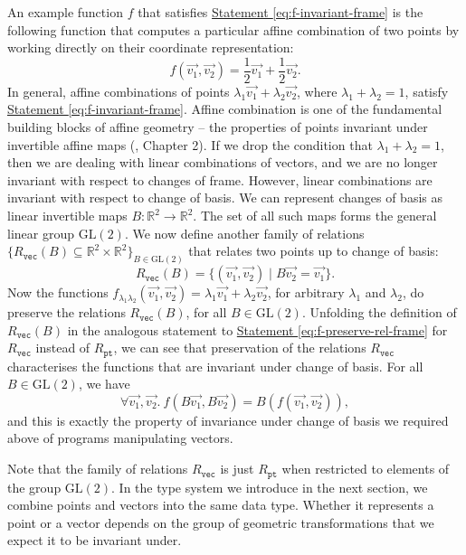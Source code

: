\documentclass{article}
\newcommand{\sepbar}{\mathrel|}
\newcommand{\GL}{\mathrm{GL}}
\newcommand{\statementref}[1]{\hyperref[#1]{Statement \ref*{#1}}}
\begin{document}
An example function $f$ that satisfies
\statementref{eq:f-invariant-frame} is the following function that
computes a particular affine combination of two points by working
directly on their coordinate representation:
\begin{displaymath}
  f(\vec{v_1}, \vec{v_2}) = \frac{1}{2}\vec{v_1} + \frac{1}{2}\vec{v_2}.
\end{displaymath}
In general, affine combinations of points $\lambda_1\vec{v_1} +
\lambda_2\vec{v_2}$, where $\lambda_1 + \lambda_2 = 1$, satisfy
\statementref{eq:f-invariant-frame}. Affine combination is one of the
fundamental building blocks of affine geometry -- the properties of
points invariant under invertible affine maps
(\cite{gallier11geometric}, Chapter 2). If we drop the condition that
$\lambda_1 + \lambda_2 = 1$, then we are dealing with linear
combinations of vectors, and we are no longer invariant with respect
to changes of frame. However, linear combinations are invariant with
respect to change of basis. We can represent changes of basis as
linear invertible maps $B : \mathbb{R}^2 \to \mathbb{R}^2$. The set of
all such maps forms the general linear group $\GL(2)$. We now define
another family of relations $\{R_{\texttt{vec}}(B) \subseteq
\mathbb{R}^2 \times \mathbb{R}^2 \}_{B \in \GL(2)}$ that relates two
points up to change of basis:
\begin{displaymath}
  R_{\texttt{vec}}(B) = \{ (\vec{v_1},\vec{v_2}) \sepbar B\vec{v_2} = \vec{v_1} \}.
\end{displaymath}
Now the functions $f_{\lambda_1\lambda_2}(\vec{v_1},\vec{v_2}) =
\lambda_1\vec{v_1} + \lambda_2\vec{v_2}$, for arbitrary $\lambda_1$
and $\lambda_2$, do preserve the relations $R_{\texttt{vec}}(B)$, for
all $B \in \GL(2)$. Unfolding the definition of $R_{\texttt{vec}}(B)$
in the analogous statement to \statementref{eq:f-preserve-rel-frame}
for $R_{\texttt{vec}}$ instead of $R_{\texttt{pt}}$, we can see that
preservation of the relations $R_{\texttt{vec}}$ characterises the
functions that are invariant under change of basis. For all $B \in \GL(2)$, we have
\begin{displaymath}
  \forall \vec{v_1}, \vec{v_2}.\ f(B\vec{v_1},B\vec{v_2}) = B(f(\vec{v_1},\vec{v_2})),
\end{displaymath}
and this is exactly the property of invariance under change of basis
we required above of programs manipulating vectors.

Note that the family of relations $R_{\texttt{vec}}$ is just
$R_{\texttt{pt}}$ when restricted to elements of the group
$\GL(2)$. In the type system we introduce in the next section, we
combine points and vectors into the same data type. Whether it
represents a point or a vector depends on the group of geometric
transformations that we expect it to be invariant under.
\end{document}
